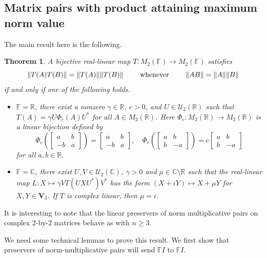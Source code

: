 \documentclass[11pt]{article}
\newtheorem{theorem}{Theorem}[section]
\numberwithin{equation}{section}
\def\IF{{\mathbb F}}
\def\IC{{\mathbb C}}
\def\IR{{\mathbb R}}
\def\bV{{\mathbf V}}
\def\bV{{\mathbf V}}
\begin{document}
\subsection{Matrix pairs with product attaining maximum norm value}
The main result here is the following.
\begin{theorem}\label{n=2}
A bijective real-linear map $T\colon M_2(\IF) \rightarrow M_2(\IF)$ satisfies
$$\|T(A)T(B)\| = \|T(A)\| \|T(B)\| \qquad \hbox{ whenever } \qquad \|AB\| = \|A\| \|B\|$$
if and only if one of the following holds.
\begin{itemize}
\item[{\rm (a)}] $\IF = \IR$,
there exist a nonzero $\gamma \in \IR$, $c>0$, and $U \in {\mathcal U}_2(\IR)$ such that $T(A) = \gamma U \Phi_c(A) U^*$ for all $A \in M_2(\IR)$.
Here $\Phi_c\colon  M_2(\IR) \to M_2(\IR)$ is a linear bijection  defined by
$$\Phi_c \left( \begin{bmatrix} a & b \\ -b & a \end{bmatrix} \right) = \begin{bmatrix} a & b \\ -b & a \end{bmatrix}, \quad \Phi_c \left( \begin{bmatrix} a & b \\ b & -a \end{bmatrix} \right) = c \begin{bmatrix} a & b \\ b & -a \end{bmatrix}$$
for all $a,b \in \IR$.
\item[{\rm (b)}] $\IF = \IC$,
 there exist  $U,V\in {\mathcal U}_2(\IC)$, $\gamma > 0$
 and $\mu\in \IC\setminus \IR $
 such that the real-linear map $L\colon X\mapsto \gamma VT(UXU^\ast)V^\ast$ has the form
$ (X+iY) \mapsto X + \mu Y$  for  $X, Y \in \bV_3$. If $T$ is complex linear, then $\mu =
i$.
\end{itemize}
\end{theorem}


It is interesting to note that the linear preservers of norm multiplicative pairs on complex $2$-by-$2$ matrices behave as with $n\ge3$.

We need some technical lemmas to prove this result.
We first show that preservers of norm-multiplicative pairs will send $\IF I$ to $\IF I$.
\end{document}
